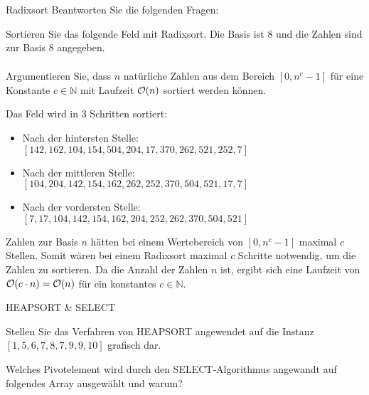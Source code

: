 \documentclass{article}
\begin{document}
\begin{eexercises}{Radixsort}{
    Beantworten Sie die folgenden Fragen:
  }
  \item Sortieren Sie das folgende Feld mit Radixsort. Die Basis ist 8 und die Zahlen sind zur Basis 8 angegeben.
  \begin{align*}
    [142, 204, 154, 7, 104, 162, 521, 17, 262, 504, 370, 252]
  \end{align*}
  \item Argumentieren Sie, dass $n$ natürliche Zahlen aus dem Bereich $[0, n^c - 1]$ für eine Konstante $c \in \mathbb{N}$ mit Laufzeit $\mathcal{O}(n)$ sortiert werden können.
\end{eexercises}

\begin{solutions}
  \item Das Feld wird in 3 Schritten sortiert:
  \begin{itemize}
    \item Nach der hintersten Stelle: $[142, 162, 104, 154, 504, 204, 17, 370, 262, 521, 252, 7]$
    \item Nach der mittleren Stelle: $[104, 204, 142, 154, 162, 262, 252, 370, 504, 521, 17, 7]$
    \item Nach der vordersten Stelle: $[7, 17, 104, 142, 154, 162, 204, 252, 262, 370, 504, 521]$
  \end{itemize}
  \item Zahlen zur Basis $n$ hätten bei einem Wertebereich von $[0,n^c-1]$ maximal $c$ Stellen. Somit wären bei einem Radixsort maximal $c$ Schritte notwendig, um die Zahlen zu sortieren. Da die Anzahl der Zahlen $n$ ist, ergibt sich eine Laufzeit von $\mathcal{O}(c\cdot n)=\mathcal{O}(n)$ für ein konstantes $c\in \mathbb{N}$.
\end{solutions}

\begin{exercises}{HEAPSORT \& SELECT}
\item Stellen Sie das Verfahren von HEAPSORT angewendet auf die Instanz $[1,5,6,7,8,7,9,9,10]$ grafisch dar.
\item Welches Pivotelement wird durch den SELECT-Algorithmus angewandt auf folgendes Array ausgewählt und warum?
\begin{equation*}
  [8,22,2,6,15,11,12,1,13,9,7,55,3,30,41]
\end{equation*}
\end{exercises}
\end{document}

